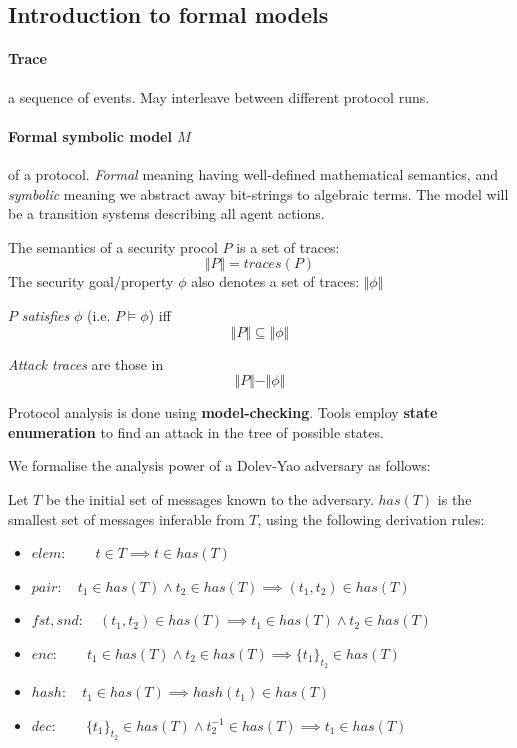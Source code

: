 \subsection{Introduction to formal models} \label{formal_models}

\paragraph{Trace} a sequence of events. May interleave between different protocol runs.

\paragraph{Formal symbolic model $M$} of a protocol. \textit{Formal} meaning having well-defined mathematical semantics, and \textit{symbolic} meaning we abstract away bit-strings to algebraic terms. The model will be a transition systems describing all agent actions.

The semantics of a security procol $P$ is a set of traces:
$$ \Vert P \Vert = traces(P)$$
The security goal/property $\phi$ also denotes a set of traces: $ \Vert \phi \Vert $

$P$ \textit{satisfies} $\phi$ (i.e.  $P \models \phi $) iff
$$ \Vert P \Vert \subseteq \Vert \phi \Vert $$

\textit{Attack traces} are those in
$$ \Vert P \Vert - \Vert \phi \Vert $$

Protocol analysis is done using \textbf{model-checking}. Tools employ \textbf{state enumeration} to find an attack in the tree of possible states.

\horizontaldivider

We formalise the analysis power of a Dolev-Yao adversary as follows:

Let $T$ be the initial set of messages known to the adversary. $has(T)$ is the smallest set of messages inferable from $T$, using the following derivation rules:

\begin{itemize}
    \item $elem: \qquad t \in T \implies t \in has(T) $
    \item $pair: \quad t_1 \in has(T) \land t_2 \in has(T) \implies (t_1, t_2) \in has(T) $
    \item $fst,snd: \quad (t_1, t_2) \in has(T) \implies t_1 \in has(T) \land t_2 \in has(T) $
    \item $enc: \qquad t_1 \in has(T) \land t_2 \in has(T) \implies \{ t_1 \}_{t_2} \in has(T) $
    \item $hash: \quad t_1 \in has(T) \implies hash(t_1) \in has(T) $
    \item $dec: \qquad \{ t_1 \}_{t_2} \in has(T) \land t_2^{-1} \in has(T) \implies t_1 \in has(T) $
\end{itemize}


